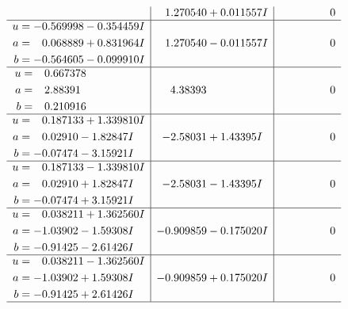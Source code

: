 \documentclass[1p]{elsarticle_modified}
\theoremstyle{definition}
\begin{document}
$$\begin{array}{c|c|c}
 & \phantom{-}1.270540 + 0.011557 I & \phantom{-0.000000 } 0 \\ \hline\begin{aligned}
u &= -0.569998 - 0.354459 I \\
a &= \phantom{-}0.068889 + 0.831964 I \\
b &= -0.564605 - 0.099910 I\end{aligned}
 & \phantom{-}1.270540 - 0.011557 I & \phantom{-0.000000 } 0 \\ \hline\begin{aligned}
u &= \phantom{-}0.667378\phantom{ +0.000000I} \\
a &= \phantom{-}2.88391\phantom{ +0.000000I} \\
b &= \phantom{-}0.210916\phantom{ +0.000000I}\end{aligned}
 & \phantom{-}4.38393\phantom{ +0.000000I} & \phantom{-0.000000 } 0 \\ \hline\begin{aligned}
u &= \phantom{-}0.187133 + 1.339810 I \\
a &= \phantom{-}0.02910 - 1.82847 I \\
b &= -0.07474 - 3.15921 I\end{aligned}
 & -2.58031 + 1.43395 I & \phantom{-0.000000 } 0 \\ \hline\begin{aligned}
u &= \phantom{-}0.187133 - 1.339810 I \\
a &= \phantom{-}0.02910 + 1.82847 I \\
b &= -0.07474 + 3.15921 I\end{aligned}
 & -2.58031 - 1.43395 I & \phantom{-0.000000 } 0 \\ \hline\begin{aligned}
u &= \phantom{-}0.038211 + 1.362560 I \\
a &= -1.03902 - 1.59308 I \\
b &= -0.91425 - 2.61426 I\end{aligned}
 & -0.909859 - 0.175020 I & \phantom{-0.000000 } 0 \\ \hline\begin{aligned}
u &= \phantom{-}0.038211 - 1.362560 I \\
a &= -1.03902 + 1.59308 I \\
b &= -0.91425 + 2.61426 I\end{aligned}
 & -0.909859 + 0.175020 I & \phantom{-0.000000 } 0\\
 \hline 
 \end{array}$$\newpage$$\begin{array}{c|c|c}  

\end{array}$$
\end{document}
